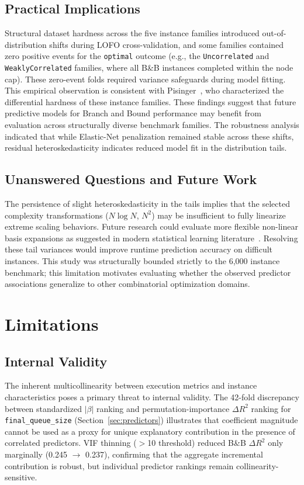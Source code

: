 \documentclass[sigconf]{acmart}
\begin{document}
\subsection{Practical Implications}
Structural dataset hardness across the five instance families introduced out-of-distribution shifts during LOFO cross-validation, and some families contained zero positive events for the \texttt{optimal} outcome (e.g., the \texttt{Uncorrelated} and \texttt{WeaklyCorrelated} families, where all B\&B instances completed within the node cap). These zero-event folds required variance safeguards during model fitting. This empirical observation is consistent with Pisinger~\cite{Pisinger2005}, who characterized the differential hardness of these instance families. These findings suggest that future predictive models for Branch and Bound performance may benefit from evaluation across structurally diverse benchmark families. The robustness analysis indicated that while Elastic-Net penalization remained stable across these shifts, residual heteroskedasticity indicates reduced model fit in the distribution tails.

\subsection{Unanswered Questions and Future Work}
The persistence of slight heteroskedasticity in the tails implies that the selected complexity transformations ($N \log N$, $N^2$) may be insufficient to fully linearize extreme scaling behaviors. Future research could evaluate more flexible non-linear basis expansions as suggested in modern statistical learning literature~\cite{Hastie2009}. Resolving these tail variances would improve runtime prediction accuracy on difficult instances. This study was structurally bounded strictly to the 6,000 instance benchmark; this limitation motivates evaluating whether the observed predictor associations generalize to other combinatorial optimization domains.

\section{Limitations}

\subsection{Internal Validity}
The inherent multicollinearity between execution metrics and instance characteristics poses a primary threat to internal validity. The 42-fold discrepancy between standardized $|\beta|$ ranking and permutation-importance $\Delta R^2$ ranking for \texttt{final\_queue\_size} (Section~\ref{sec:predictors}) illustrates that coefficient magnitude cannot be used as a proxy for unique explanatory contribution in the presence of correlated predictors. VIF thinning ($>$10 threshold) reduced B\&B $\Delta R^2$ only marginally (0.245 $\to$ 0.237), confirming that the aggregate incremental contribution is robust, but individual predictor rankings remain collinearity-sensitive.
\end{document}
